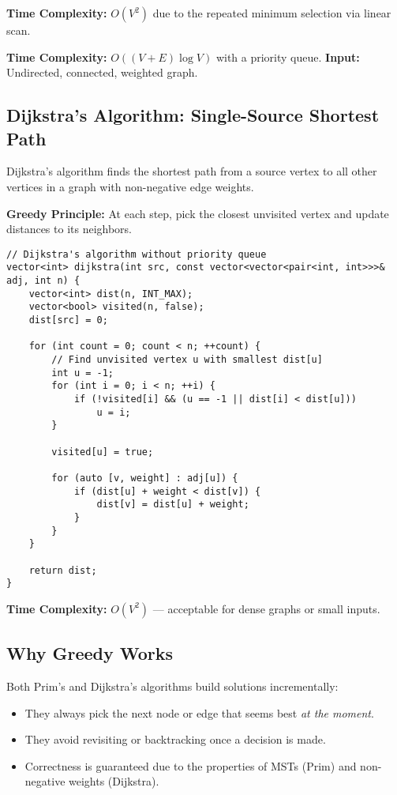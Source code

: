 \documentclass{article}
\begin{document}
\textbf{Time Complexity:} $O(V^2)$ due to the repeated minimum selection via linear scan.


\textbf{Time Complexity:} $O((V + E) \log V)$ with a priority queue.  
\textbf{Input:} Undirected, connected, weighted graph.

\subsection{Dijkstra’s Algorithm: Single-Source Shortest Path}

Dijkstra’s algorithm finds the shortest path from a source vertex to all other vertices in a graph with non-negative edge weights.

\textbf{Greedy Principle:} At each step, pick the closest unvisited vertex and update distances to its neighbors.

\begin{lstlisting}[style=cppstyle]
// Dijkstra's algorithm without priority queue
vector<int> dijkstra(int src, const vector<vector<pair<int, int>>>& adj, int n) {
    vector<int> dist(n, INT_MAX);
    vector<bool> visited(n, false);
    dist[src] = 0;

    for (int count = 0; count < n; ++count) {
        // Find unvisited vertex u with smallest dist[u]
        int u = -1;
        for (int i = 0; i < n; ++i) {
            if (!visited[i] && (u == -1 || dist[i] < dist[u]))
                u = i;
        }

        visited[u] = true;

        for (auto [v, weight] : adj[u]) {
            if (dist[u] + weight < dist[v]) {
                dist[v] = dist[u] + weight;
            }
        }
    }

    return dist;
}
\end{lstlisting}

\textbf{Time Complexity:} $O(V^2)$ — acceptable for dense graphs or small inputs.


\subsection{Why Greedy Works}

Both Prim's and Dijkstra's algorithms build solutions incrementally:
\begin{itemize}
    \item They always pick the next node or edge that seems best \textit{at the moment}.
    \item They avoid revisiting or backtracking once a decision is made.
    \item Correctness is guaranteed due to the properties of MSTs (Prim) and non-negative weights (Dijkstra).
\end{itemize}
\end{document}
